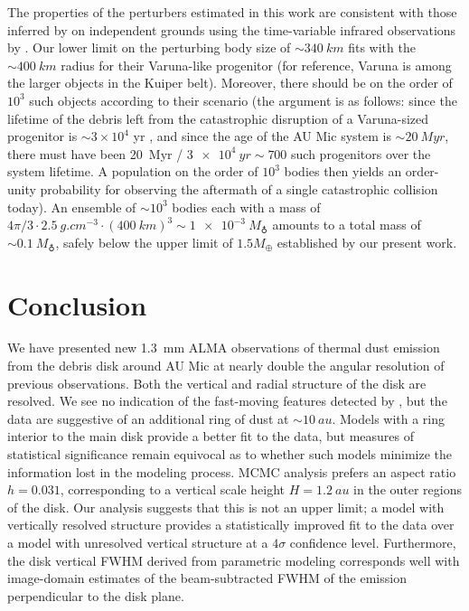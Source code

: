 \documentclass[modern]{aastex62}
\begin{document}
The properties of the perturbers estimated in this work are consistent with those inferred by \citet{chiang&fung17} on independent grounds using the time-variable infrared observations by \citet{boccaletti15,boccaletti18}. 
Our lower limit on the perturbing body size of $\sim \SI{340}{km}$ fits with the $\sim \SI{400}{km}$ radius for their Varuna-like progenitor (for reference, Varuna is among the larger objects in the Kuiper belt). 
Moreover, there should be on the order of $10^3$ such objects according to their scenario (the argument is as follows: since the lifetime of the debris left from the catastrophic disruption of a Varuna-sized progenitor is $\sim$$3 \times 10^4$ yr \citep[][their equation 21]{chiang&fung17}, and since the age of the AU Mic system is $\sim \SI{20}{Myr}$, there must have been \SI{20}{Myr} / $ \SI{3e4}{yr} \sim 700$ such progenitors over the system lifetime. 
A population on the order of $10^3$ bodies then yields an order-unity probability for observing the aftermath of a single catastrophic collision today). 
An ensemble of $\sim 10^3$ bodies each with a mass of $4\pi/3 \cdot \SI{2.5}{g.cm^{-3}} \cdot (\SI{400}{km})^3 \sim \SI{1e-3}{M_\earth}$ amounts to a total mass of $\sim \SI{0.1}{M_\earth}$, safely below the upper limit of $1.5 M_\oplus$ established by our present work.

\section{Conclusion}
\label{section: conclusion}

We have presented new \SI{1.3}{mm} ALMA observations of thermal dust emission from the debris disk around AU Mic at nearly double the angular resolution of previous observations. 
Both the vertical and radial structure of the disk are resolved.
We see no indication of the fast-moving features detected by \cite{boccaletti15}, but the data are suggestive of an additional ring of dust at $\sim \SI{10}{au}$.
Models with a ring interior to the main disk provide a better fit to the data, but measures of statistical significance remain equivocal as to whether such models minimize the information lost in the modeling process.
MCMC analysis prefers an aspect ratio $h = 0.031$, corresponding to a vertical scale height $H = \SI{1.2}{au}$ in the outer regions of the disk.
Our analysis suggests that this is not an upper limit; a model with vertically resolved structure provides a statistically improved fit to the data over a model with unresolved vertical structure at a $4 \sigma$ confidence level.
Furthermore, the disk vertical FWHM derived from parametric modeling corresponds well with image-domain estimates of the beam-subtracted FWHM of the emission perpendicular to the disk plane.
\end{document}
